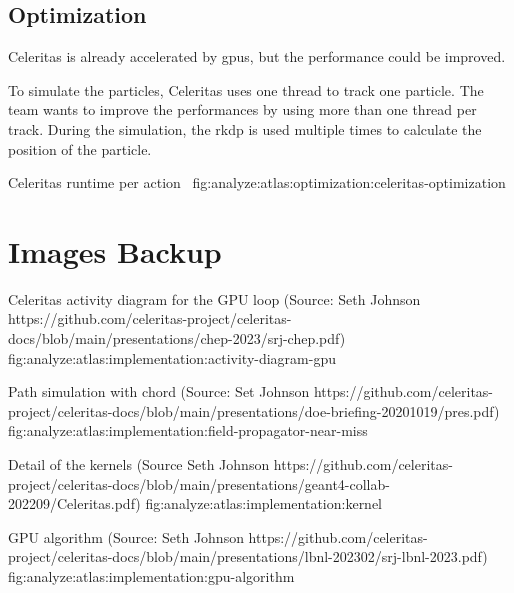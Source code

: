 \subsection{Optimization}
\label{ch:analyze:atlas:optimization}

Celeritas is already accelerated by \acrshort{gpu}s, but the performance could
be improved.

To simulate the particles, Celeritas uses one thread to track one particle.
The team wants to improve the performances by using more than one thread per
track.
During the simulation, the \acrfull{rkdp} is used multiple times to calculate
the position of the particle.

{Celeritas runtime per action~\cite{chep2023-presentation-johnson}}
{fig:analyze:atlas:optimization:celeritas-optimization}





\section{Images Backup}
\label{ch:analyze:images}

{Celeritas activity diagram for the GPU loop (Source: Seth Johnson https://github.com/celeritas-project/celeritas-docs/blob/main/presentations/chep-2023/srj-chep.pdf)}
{fig:analyze:atlas:implementation:activity-diagram-gpu}

{Path simulation with chord (Source: Set Johnson https://github.com/celeritas-project/celeritas-docs/blob/main/presentations/doe-briefing-20201019/pres.pdf)}
{fig:analyze:atlas:implementation:field-propagator-near-miss}

{Detail of the kernels (Source Seth Johnson https://github.com/celeritas-project/celeritas-docs/blob/main/presentations/geant4-collab-202209/Celeritas.pdf)}
{fig:analyze:atlas:implementation:kernel}

{GPU algorithm (Source: Seth Johnson https://github.com/celeritas-project/celeritas-docs/blob/main/presentations/lbnl-202302/srj-lbnl-2023.pdf)}
{fig:analyze:atlas:implementation:gpu-algorithm}
